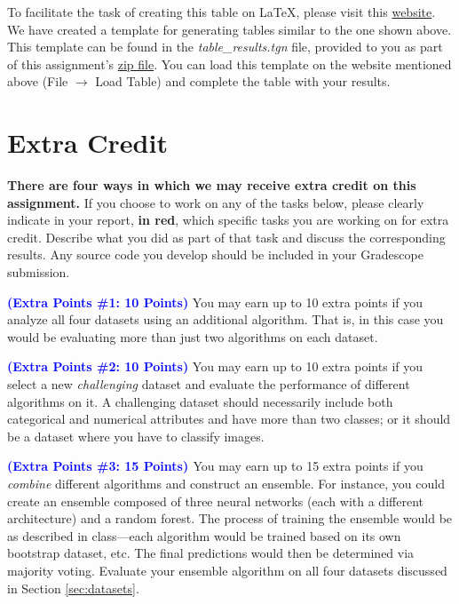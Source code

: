 \documentclass[letterpaper]{article}
\newcommand{\HIGHLIGHT}[1]{\textcolor{blue}{\textbf{#1}}}
\begin{document}
To facilitate the task of creating this table on \LaTeX, please visit this \href{https://www.tablesgenerator.com}{website}. We have created a template for generating tables similar to the one shown above. This template can be found in the \textit{table\_results.tgn} file, provided to you as part of this assignment's  \href{https://people.cs.umass.edu/~bsilva/courses/CMPSCI_589/Spring2024/homeworks/final_project.zip}{zip file}. You can load this template on the website mentioned above (File $\rightarrow$ Load Table) and complete the table with your results.



\newpage

\section{Extra Credit}
\label{sec:extra_credit}

\textbf{There are four ways in which we may receive extra credit on this assignment.} If you choose to work on any of the tasks below, please clearly indicate in your report,  \textcolor{dark-red}{\textbf{in red}}, which specific tasks you are working on for extra credit. Describe what you did as part of that task and discuss the corresponding results. Any source code you develop should be included in your Gradescope submission.

\noindent \HIGHLIGHT{\textcolor{dark-red}{(Extra Points \#1: 10 Points)}}
You may earn up to 10 extra points if you analyze all four datasets using an additional algorithm. That is, in this case you would be evaluating more than just two algorithms on each dataset.

\noindent \HIGHLIGHT{(Extra Points \#2: 10 Points)}
You may earn up to 10 extra points if you select a new \textit{challenging} dataset and evaluate the performance of different algorithms on it. A challenging dataset should necessarily include both categorical and numerical attributes and have more than two classes; or it should be a dataset where you have to classify images.

\noindent \HIGHLIGHT{\textcolor{dark-red}{ (Extra Points \#3: 15 Points) }}
You may earn up to 15 extra points if you \textit{combine} different algorithms and construct an ensemble. For instance, you could create an ensemble composed of three neural networks (each with a different architecture) and a random forest. The process of training the ensemble would be as described in class---each algorithm would be trained based on its own bootstrap dataset, etc. The final predictions would then be determined via majority voting. Evaluate your ensemble algorithm on all four datasets discussed in Section \ref{sec:datasets}.
\end{document}
